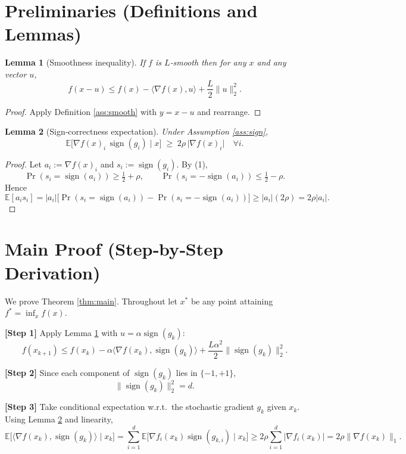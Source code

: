 \documentclass{article}
\newtheorem{lemma}{Lemma}
\newcommand{\sign}{\operatorname{sign}}
\newcommand{\E}{\mathbb{E}}
\begin{document}
\newpage

\section*{Preliminaries (Definitions and Lemmas)}
\begin{lemma}[Smoothness inequality]\label{lem:smooth}
If $f$ is $L$‑smooth then for any $x$ and any vector $u$,
\[
f(x-u)\le f(x)-\langle\nabla f(x),u\rangle+\frac{L}{2}\|u\|_{2}^{2}.
\]
\end{lemma}
\begin{proof}
Apply Definition \ref{ass:smooth} with $y=x-u$ and rearrange.
\end{proof}

\begin{lemma}[Sign‑correctness expectation]\label{lem:signexp}
Under Assumption \ref{ass:sign},
\[
\E\!\bigl[\nabla f(x)_i\,\sign(g_i)\mid x\bigr]\;\ge\;2\rho\,\bigl|\nabla f(x)_i\bigr|\quad\forall i.
\tag{3}
\]
\end{lemma}
\begin{proof}
Let $a_i:=\nabla f(x)_i$ and $s_i:=\sign(g_i)$.  By (1),
\[
\Pr(s_i=\sign(a_i))\ge\tfrac12+\rho,\qquad
\Pr(s_i=-\sign(a_i))\le\tfrac12-\rho .
\]
Hence
\[
\E[a_i s_i]=|a_i|\bigl[\Pr(s_i=\sign(a_i))-\Pr(s_i=-\sign(a_i))\bigr]
\ge|a_i|(2\rho)=2\rho|a_i|.
\]
\end{proof}

\section*{Main Proof (Step‑by‑Step Derivation)}
We prove Theorem \ref{thm:main}.  Throughout let $x^{*}$ be any point attaining $f^{*}=\inf_{x}f(x)$.

\bigskip
\noindent\textbf{[Step 1]} Apply Lemma \ref{lem:smooth} with $u=\alpha\sign(g_k)$:
\[
f(x_{k+1})\le f(x_k)-\alpha\langle\nabla f(x_k),\sign(g_k)\rangle
               +\frac{L\alpha^{2}}{2}\|\sign(g_k)\|_{2}^{2}.
\tag{4}
\]

\noindent\textbf{[Step 2]} Since each component of $\sign(g_k)$ lies in $\{-1,+1\}$,
\[
\|\sign(g_k)\|_{2}^{2}=d.
\tag{5}
\]

\noindent\textbf{[Step 3]} Take conditional expectation w.r.t.\ the stochastic gradient $g_k$ given $x_k$.
Using Lemma \ref{lem:signexp} and linearity,
\[
\E\!\bigl[\langle\nabla f(x_k),\sign(g_k)\rangle\mid x_k\bigr]
   =\sum_{i=1}^{d}\E\!\bigl[\nabla f_i(x_k)\sign(g_{k,i})\mid x_k\bigr]
   \ge 2\rho\sum_{i=1}^{d}|\nabla f_i(x_k)|
   =2\rho\|\nabla f(x_k)\|_{1}.
\tag{6}
\]
\end{document}
